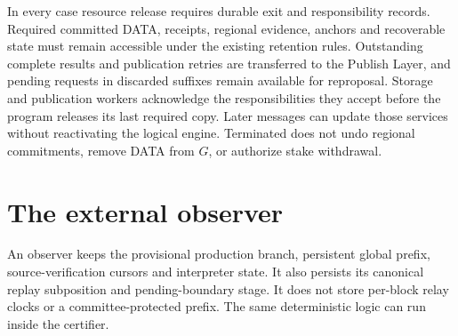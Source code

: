 \documentclass[11pt,a4paper]{article}
\begin{document}
In every case resource release requires durable exit and responsibility
records. Required committed DATA, receipts, regional evidence, anchors
and recoverable state must remain accessible under the existing
retention rules. Outstanding complete results and publication retries
are transferred to the Publish Layer, and pending requests in discarded
suffixes remain available for reproposal. Storage and publication
workers acknowledge the responsibilities they accept before the
program releases its last required copy. Later messages can update
those services without reactivating the logical engine. Terminated
does not undo regional commitments, remove DATA from $G$, or authorize
stake withdrawal.





\section{The external observer}
\label{sec:observers}
An observer keeps the provisional production branch, persistent global
prefix, source-verification cursors and interpreter state. It also persists
its canonical replay subposition and pending-boundary stage. It does not
store per-block relay clocks or a committee-protected prefix.
The same deterministic logic can run inside the certifier.
\end{document}

